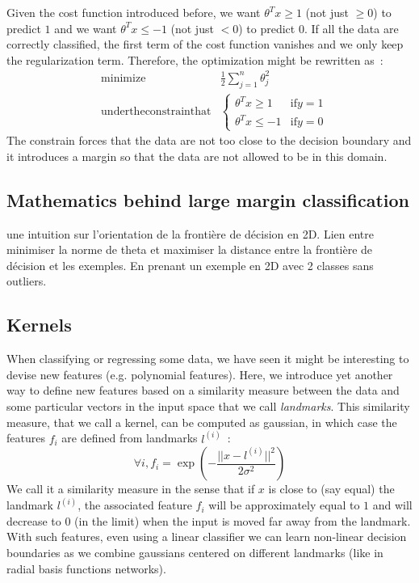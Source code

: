 \documentclass[10pt,a4paper]{article}
\begin{document}
Given the cost function introduced before, we want $\theta^T x \geq 1$
(not just $\geq 0$) to predict $1$ and we want $\theta^T x \leq -1$
(not just $< 0$) to predict $0$. If all the data are correctly
classified, the first term of the cost function vanishes and we only
keep the regularization term. Therefore, the optimization might be
rewritten as~:
\begin{eqnarray}
&\mathrm{minimize}& \frac{1}{2} \sum_{j=1}^n \theta_j^2 \\
&\mathrm{under the constrain that} & \begin{cases}
\theta^T x \geq 1 & \mathrm{if } y = 1\\
\theta^T x \leq -1 & \mathrm{if } y = 0
\end{cases}
\end{eqnarray}
The constrain forces that the data are not too close to the decision
boundary and it introduces a margin so that the data are not allowed
to be in this domain. 

\subsection{Mathematics behind large margin classification}

une intuition sur l'orientation de la frontière de décision en
2D. Lien entre minimiser la norme de theta et maximiser la distance
entre la frontière de décision et les exemples. En prenant un exemple
en 2D avec 2 classes sans outliers.

\subsection{Kernels}

When classifying or regressing some data, we have seen it might be
interesting to devise new features (e.g. polynomial features). Here,
we introduce yet another way to define new features based on a
similarity measure between the data and some particular vectors in the
input space that we call \emph{landmarks}. This similarity measure,
that we call a kernel, can be computed as gaussian, in which case the
features $f_i$ are defined from landmarks $l^{(i)}$~:
\begin{equation}
 \forall i, f_i = \exp(-\frac{||x - l^{(i)}||^2}{2\sigma^2})
\end{equation}
We call it a similarity measure in the sense that if $x$ is close to
(say equal) the landmark $l^{(i)}$, the associated feature $f_i$ will
be approximately equal to $1$ and will decrease to $0$ (in the limit)
when the input is moved far away from the landmark. With such
features, even using a linear classifier we can learn non-linear
decision boundaries as we combine gaussians centered on different
landmarks (like in radial basis functions networks).\\
\end{document}
